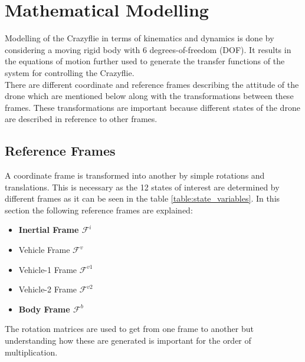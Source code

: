 \section{Mathematical Modelling}

Modelling of the Crazyflie in terms of kinematics and dynamics is done by considering a moving rigid body with 6 degrees-of-freedom (DOF). It results in the equations of motion further used to generate the transfer functions of the system for controlling the Crazyflie. \\

There are different coordinate and reference frames describing the attitude of the drone which are mentioned below along with the transformations between these frames. These transformations are important because different states of the drone are described in reference to other frames.

\subsection{Reference Frames}

A coordinate frame is transformed into another by simple rotations and translations. This is necessary as the 12 states of interest are determined by different frames as it can be seen in the table \ref{table:state_variables}. In this section the following reference frames are explained:

\begin{itemize}
    \item \textbf{Inertial Frame $\mathcal{F}^i$}
    \item Vehicle Frame $\mathcal{F}^v$
    \item Vehicle-1 Frame $\mathcal{F}^{v1}$
    \item Vehicle-2 Frame $\mathcal{F}^{v2}$
    \item \textbf{Body Frame $\mathcal{F}^b$}
\end{itemize}

The rotation matrices are used to get from one frame to another but understanding how these are generated is important for the order of multiplication. 

